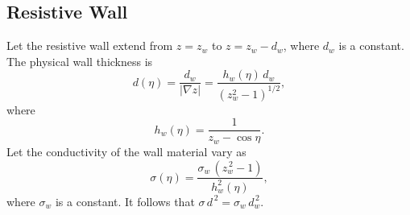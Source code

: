 \documentclass[12pt,prb,aps,notitlepage]{revtex4-1}
\begin{document}
\subsection{Resistive Wall}
Let the resistive wall extend from $z=z_w$ to $z=z_w-d_w$, where $d_w$ is a constant. The physical wall thickness is
\begin{equation}
d(\eta)= \frac{d_w}{|\nabla z|} = \frac{h_w(\eta)\,d_w}{(z_w^2-1)^{1/2}},
\end{equation}
where
\begin{equation}
h_w(\eta) = \frac{1}{z_w-\cos\eta}.
\end{equation}
Let the conductivity of the wall material vary as
\begin{equation}
\sigma(\eta) = \frac{\sigma_w\,(z_w^{\,2}-1)}{h_w^2(\eta)},
\end{equation}
where $\sigma_w$ is a constant. It follows that $\sigma\,d^{\,2}=\sigma_w\,d_w^{\,2}$. 
\end{document}
